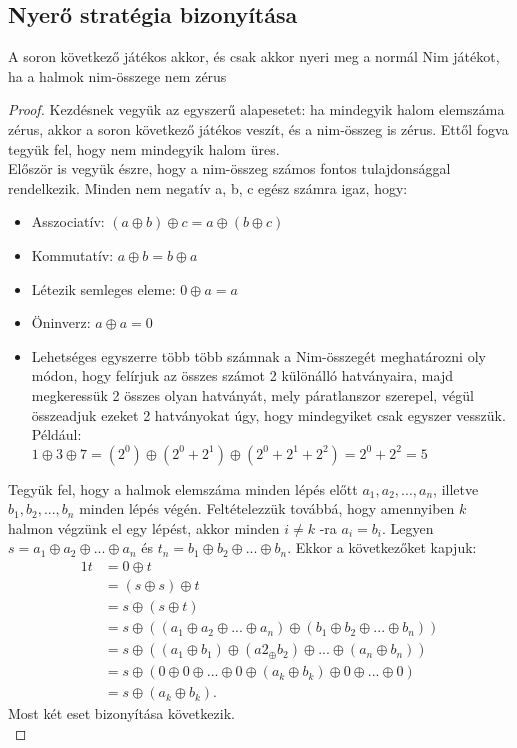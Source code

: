 \subsection{Nyerő stratégia bizonyítása}
\begin{theorem}
	A soron következő játékos akkor, és csak akkor nyeri meg a normál Nim játékot, ha a halmok nim-összege nem zérus
\end{theorem}

\begin{proof}
Kezdésnek vegyük az egyszerű alapesetet: ha mindegyik halom elemszáma zérus, akkor a soron következő játékos veszít, és a nim-összeg is zérus. Ettől fogva tegyük fel, hogy nem mindegyik halom üres. \\

Először is vegyük észre, hogy a nim-összeg számos fontos tulajdonsággal rendelkezik. Minden nem negatív a, b, c egész számra igaz, hogy:
\begin{itemize}
	\item Asszociatív: $(a \oplus b) \oplus c = a \oplus (b \oplus c)$
	\item Kommutatív: $a \oplus b = b \oplus a$
	\item Létezik semleges eleme: $0 \oplus a = a$
	\item Öninverz: $a \oplus a = 0$
	\item Lehetséges egyszerre több több számnak a Nim-összegét meghatározni oly módon, hogy felírjuk az összes számot 2 különálló hatványaira, majd megkeressük 2 összes olyan hatványát, mely páratlanszor szerepel, végül összeadjuk ezeket 2 hatványokat úgy, hogy mindegyiket csak egyszer vesszük. Például: \\
	$1 \oplus 3 \oplus 7 = (2^0) \oplus (2^0 + 2^1) \oplus (2^0 + 2^1 + 2^2) = 2^0 + 2^2 = 5$
\end{itemize}

Tegyük fel, hogy a halmok elemszáma minden lépés előtt $a_1, a_2, ..., a_n$, illetve $b_1, b_2, ..., b_n$ minden lépés végén. Feltételezzük továbbá, hogy amennyiben $k$ halmon végzünk el egy lépést, akkor minden $i \neq k$ -ra $a_i = b_i$. Legyen $s = a_1 \oplus a_2 \oplus ... \oplus a_n$ és $t_n = b_1 \oplus b_2 \oplus ... \oplus b_n$. Ekkor a következőket kapjuk:
\begin{alignat*}{1}
	t &= 0 \oplus t \\
	&= (s \oplus s) \oplus t \\
	&= s \oplus (s \oplus t) \\
	&= s \oplus ((a_1 \oplus a_2 \oplus ... \oplus a_n) \oplus (b_1 \oplus b_2 \oplus ... \oplus b_n)) \\
	&= s \oplus ((a_1 \oplus b_1) \oplus (a2_ \oplus b_2) \oplus ... \oplus (a_n \oplus b_n)) \\
	&= s \oplus (0 \oplus 0 \oplus ... \oplus 0 \oplus (a_k \oplus b_k) \oplus 0 \oplus ... \oplus 0) \\
	&= s \oplus (a_k \oplus b_k).
\end{alignat*}
Most két eset bizonyítása következik. \\


\end{proof}
